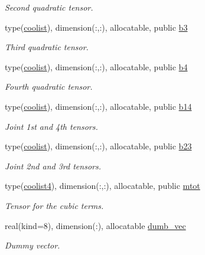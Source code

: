\begin{DoxyCompactItemize}
\begin{DoxyCompactList}\small\item\em Second quadratic tensor. \end{DoxyCompactList}\item 
type(\hyperlink{structtensor_1_1coolist}{coolist}), dimension(\+:,\+:), allocatable, public \hyperlink{namespacewl__tensor_acb8c2d5390bd52d0639dc7ae48a0f7de}{b3}
\begin{DoxyCompactList}\small\item\em Third quadratic tensor. \end{DoxyCompactList}\item 
type(\hyperlink{structtensor_1_1coolist}{coolist}), dimension(\+:,\+:), allocatable, public \hyperlink{namespacewl__tensor_a38deaa44b73e766ce5cc8194e18a1540}{b4}
\begin{DoxyCompactList}\small\item\em Fourth quadratic tensor. \end{DoxyCompactList}\item 
type(\hyperlink{structtensor_1_1coolist}{coolist}), dimension(\+:,\+:), allocatable, public \hyperlink{namespacewl__tensor_a61a16cdd059c4be04ecad332fe4b19f8}{b14}
\begin{DoxyCompactList}\small\item\em Joint 1st and 4th tensors. \end{DoxyCompactList}\item 
type(\hyperlink{structtensor_1_1coolist}{coolist}), dimension(\+:,\+:), allocatable, public \hyperlink{namespacewl__tensor_a5bc7875af2f8e170302f6d8856010ce3}{b23}
\begin{DoxyCompactList}\small\item\em Joint 2nd and 3rd tensors. \end{DoxyCompactList}\item 
type(\hyperlink{structtensor_1_1coolist4}{coolist4}), dimension(\+:,\+:), allocatable, public \hyperlink{namespacewl__tensor_adca9555f9f2997566b295bcc1ef1df25}{mtot}
\begin{DoxyCompactList}\small\item\em Tensor for the cubic terms. \end{DoxyCompactList}\item 
real(kind=8), dimension(\+:), allocatable \hyperlink{namespacewl__tensor_abe9c42af0dab6da6584889043aaab679}{dumb\+\_\+vec}
\begin{DoxyCompactList}\small\item\em Dummy vector. \end{DoxyCompactList}\item 

\end{DoxyCompactItemize}
